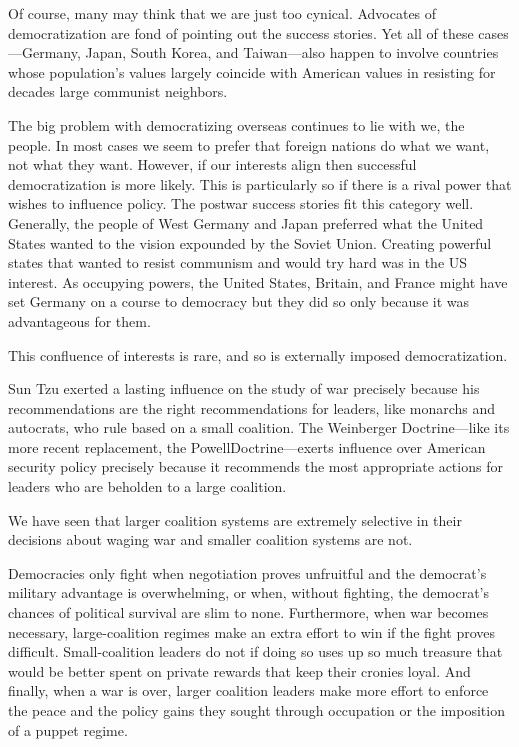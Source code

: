 \documentclass[10pt]{article}
\begin{document}
{\large Of course, many may think that we are just too cynical. Advocates of
democratization are fond of pointing out the success stories. Yet all of these
cases---Germany, Japan, South Korea, and Taiwan---also happen to involve
countries whose population's values largely coincide with American values in
resisting for decades large communist neighbors.}

{\large The big problem with democratizing overseas continues to lie with we,
the people. In most cases we seem to prefer that foreign nations do what we want,
not what they want. However, if our interests align then successful
democratization is more likely. This is particularly so if there is a rival power
that wishes to influence policy. The postwar success stories fit this category
well. Generally, the people of West Germany and Japan preferred what the United
States wanted to the vision expounded by the Soviet Union. Creating powerful
states that wanted to resist communism and would try hard was in the US interest.
As occupying powers, the United States, Britain, and France might have set
Germany on a course to democracy but they did so only because it was advantageous
for them.}

{\large This confluence of interests is rare, and so is externally imposed
democratization.}

{\large Sun Tzu exerted a lasting influence on the study of war precisely
because his recommendations are the right recommendations for leaders, like
monarchs and autocrats, who rule based on a small coalition. The Weinberger
Doctrine---like its more recent replacement, the PowellDoctrine---exerts
influence over American security policy precisely because it recommends the most
appropriate actions for leaders who are beholden to a large coalition.}

{\large We have seen that larger coalition systems are extremely selective in
their decisions about waging war and smaller coalition systems are not.}

{\large Democracies only fight when negotiation proves unfruitful and the
democrat's military advantage is overwhelming, or when, without fighting, the
democrat's chances of political survival are slim to none. Furthermore, when war
becomes necessary, large-coalition regimes make an extra effort to win if the
fight proves difficult. Small-coalition leaders do not if doing so uses up so
much treasure that would be better spent on private rewards that keep their
cronies loyal. And finally, when a war is over, larger coalition leaders make
more effort to enforce the peace and the policy gains they sought through
occupation or the imposition of a puppet regime.}
\end{document}

